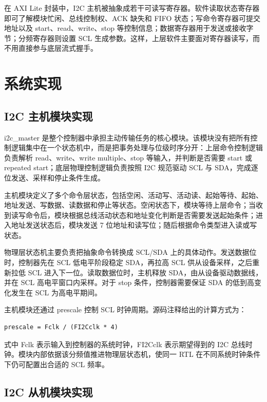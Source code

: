 \documentclass[12pt,a4paper]{article}
\numberwithin{equation}{section}
\begin{document}
在 AXI Lite 封装中，I2C
主机被抽象成若干可读写寄存器。软件读取状态寄存器即可了解模块忙闲、总线控制权、ACK
缺失和 FIFO 状态；写命令寄存器可提交地址以及 start、read、write、stop
等控制信息；数据寄存器用于发送或接收字节；分频寄存器则设置 SCL
生成参数。这样，上层软件主要面对寄存器读写，而不用直接参与底层流式握手。

\section{系统实现}\label{ux7cfbux7edfux5b9eux73b0}

\subsection{I2C
主机模块实现}\label{i2c-ux4e3bux673aux6a21ux5757ux5b9eux73b0}

i2c\_master
是整个控制器中承担主动传输任务的核心模块。该模块没有把所有控制逻辑集中在一个状态机中，而是把事务处理与位级时序分开：上层命令控制逻辑负责解析
read、write、write multiple、stop 等输入，并判断是否需要 start 或
repeated start；底层物理控制逻辑负责按照 I2C 规范驱动 SCL 与
SDA，完成逐位发送、采样和停止条件生成。

主机模块定义了多个命令层状态，包括空闲、活动写、活动读、起始等待、起始、地址发送、写数据、读数据和停止等状态。空闲状态下，模块等待上层命令；当收到读写命令后，模块根据总线活动状态和地址变化判断是否需要发送起始条件；进入地址发送状态后，模块发送
7 位地址和读写位；随后根据命令类型进入读或写状态。

物理层状态机主要负责把抽象命令转换成 SCL/SDA
上的具体动作。发送数据位时，控制器先在 SCL 低电平阶段稳定 SDA，再拉高
SCL 供从设备采样，之后重新拉低 SCL 进入下一位。读取数据位时，主机释放
SDA，由从设备驱动数据线，并在 SCL 高电平窗口内采样。对于 stop
条件，控制器需要保证 SDA 的低到高变化发生在 SCL 为高电平期间。

主机模块还通过 prescale 控制 SCL
时钟周期。源码注释给出的计算方式为：

\begin{lstlisting}
prescale = Fclk / (FI2Cclk * 4)
\end{lstlisting}

式中 Fclk
表示输入到控制器的系统时钟，FI2Cclk
表示期望得到的 I2C
总线时钟。模块内部依据该分频值推进物理层状态机，使同一 RTL
在不同系统时钟条件下仍可配置出合适的 SCL 频率。

\subsection{I2C
从机模块实现}\label{i2c-ux4eceux673aux6a21ux5757ux5b9eux73b0}
\end{document}
